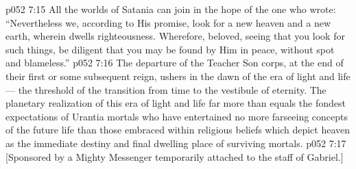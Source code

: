 \vs p052 7:15 All the worlds of Satania can join in the hope of the one who wrote: “Nevertheless we, according to His promise, look for a new heaven and a new earth, wherein dwells righteousness. Wherefore, beloved, seeing that you look for such things, be diligent that you may be found by Him in peace, without spot and blameless.”
\vs p052 7:16 \pc The departure of the Teacher Son corps, at the end of their first or some subsequent reign, ushers in the dawn of the era of light and life --- the threshold of the transition from time to the vestibule of eternity. The planetary realization of this era of light and life far more than equals the fondest expectations of Urantia mortals who have entertained no more farseeing concepts of the future life than those embraced within religious beliefs which depict heaven as the immediate destiny and final dwelling place of surviving mortals.
\vsetoff
\vs p052 7:17 [Sponsored by a Mighty Messenger temporarily attached to the staff of Gabriel.]
